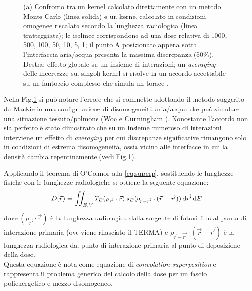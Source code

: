 {\begin{figure}[!t]
\caption{(a) Confronto tra un kernel calcolato direttamente con un metodo Monte Carlo (linea solida) e un kernel calcolato in condizioni omogenee riscalato secondo la lunghezza radiologica (linea tratteggiata); le isolinee corrispondono ad una dose relativa di 1000, 500, 100, 50, 10, 5, 1; il punto A posizionato appena sotto l'interfaccia aria/acqua presenta la massima discrepanza (50\%). Destra: effetto globale su un insieme di interazioni; un \textit{averaging} delle incertezze sui singoli kernel si risolve in un accordo accettabile su un fantoccio complesso che simula un torace \cite{Woo1990,Arnfield2000,Ahnesjo1989}.}
\label{fig:kern_dens}
\end{figure}
Nella Fig.\ref{fig:kern_dens} si può notare l'errore che si commette adottando il metodo suggerito da Mackie in una configurazione di disomogeneità aria/acqua che può simulare una situazione tessuto/polmone (Woo e Cunningham \cite{Woo1990}). Nonostante l'accordo non sia perfetto è stato dimostrato \cite{Ahnesjo1989} che su un insieme numeroso di interazioni interviene un effetto di \textit{averaging} per cui discrepanze significative rimangono solo in condizioni di estrema disomogeneità, ossia vicino alle interfacce in cui la densità cambia repentinamente (vedi Fig.\ref{fig:kern_dens}).



Applicando il teorema di O'Connor alla \eqref{eq:superp}, sostituendo le lunghezze fisiche con le lunghezze radiologiche \cite{Khan2010} si ottiene la seguente equazione:
\begin{equation}
D(\vec{r}) = \iint_{E,V} T_E(\rho_{\vec{r'}} \cdot \vec{r})\, s_E(\rho_{\vec{r}-\vec{r'}}\cdot (\vec{r}-\vec{r'}))\,\text{d}\vec{r'} \,\text{d} E
\label{eq:superp_disom}
\end{equation}
dove $(\rho_{\vec{r'}} \cdot \vec{r})$ è la lunghezza radiologica dalla sorgente di fotoni fino al punto di interazione primaria (ove viene rilasciato il TERMA) e $\rho_{\vec{r}-\vec{r'}}\cdot (\vec{r}-\vec{r'})$ è la lunghezza radiologica dal punto di interazione primaria al punto di deposizione della dose.\\
Questa equazione è nota come equazione di \textit{convolution-superposition} e rappresenta il problema generico del calcolo della dose per un fascio polienergetico e mezzo disomogeneo.

}
